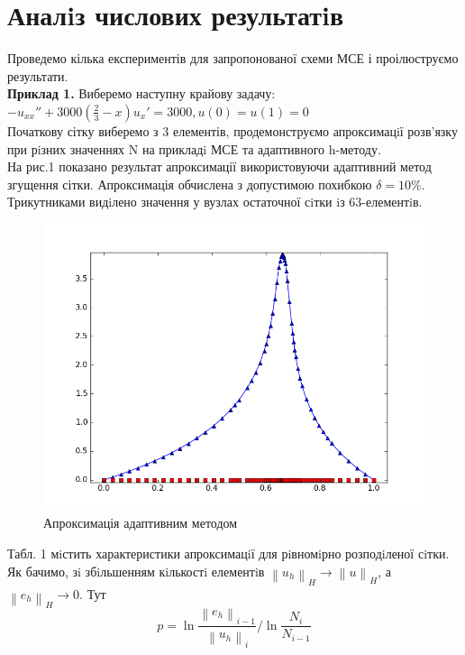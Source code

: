 \documentclass[a4paper]{article}
\newcommand\norm[1]{\left\lVert#1\right\rVert}
\numberwithin{equation}{section}
\begin{document}
\section{Аналiз числових результатiв}
Проведемо кілька експериментів для запропонованої схеми МСЕ і проілюструємо результати.\\
\textbf{Приклад 1.} Виберемо наступну крайову задачу:
$-u_{xx}'' + 3000(\frac{2}{3} - x)u_x'=3000, u(0)=u(1)=0$\\
Початкову сітку виберемо з 3 елементів, продемонструємо апроксимацiї розв’язку при рiзних значен\-нях N на прикладi МСЕ та адаптивного h-методу.\\
На рис.1 показано результат апроксимації використовуючи адаптивний метод згущення сітки. Апроксимація обчислена з допустимою похибкою $\delta=10\%$. Трикутниками видiлено значення у вузлах остаточної сiтки iз 63-елементiв.
\begin{figure}[H]
\includegraphics[width=\textwidth]{figure_1.png}
\caption{Апроксимація адаптивним методом}
\end{figure}
Табл. 1 мiстить характеристики апроксимацiї для рiвномiрно розподiленої сiтки. Як бачимо, зi збiльшенням кiлькостi елементiв $\norm{u_h}_H \to \norm{u}_H$, а $\norm{e_h}_H \to 0$. Тут
\begin{equation}
p=\ln{\frac{\norm{e_h}_{i-1}}{\norm{u_h}_i}}/\ln{\frac{N_i}{N_{i-1}}}
\end{equation}
\end{document}

